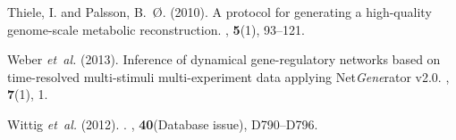 \documentclass{bioinfo}
\begin{document}
\begin{thebibliography}{}
Thiele, I. and Palsson, B.~{\O}. (2010).
\newblock A protocol for generating a high-quality genome-scale metabolic
  reconstruction.
, {\bf 5}(1), 93--121.

Weber {\em et~al.} (2013).
\newblock Inference of dynamical gene-regulatory networks based on
  time-resolved multi-stimuli multi-experiment data applying Net\emph{Gene}rator v2.0.
, {\bf 7}(1), 1.

Wittig {\em et~al.} (2012).
.
, {\bf 40}(Database issue), D790--D796.

\end{thebibliography}
\end{document}
